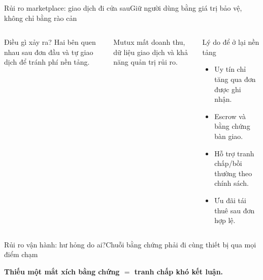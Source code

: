 \begin{frame}{Rủi ro marketplace: giao dịch đi cửa sau}{Giữ người dùng bằng giá trị bảo vệ, không chỉ bằng rào cản}
  \begin{columns}[T,onlytextwidth]
      \begin{alertblock}{Điều gì xảy ra?}
        Hai bên quen nhau sau đơn đầu và tự giao dịch để tránh phí nền tảng.
      \end{alertblock}
      \vspace{.3em}
      Mutux mất doanh thu, dữ liệu giao dịch và khả năng quản trị rủi ro.
      \begin{exampleblock}{Lý do để ở lại nền tảng}
        \begin{itemize}\small
          \item Uy tín chỉ tăng qua đơn được ghi nhận.
          \item Escrow và bằng chứng bàn giao.
          \item Hỗ trợ tranh chấp/bồi thường theo chính sách.
          \item Ưu đãi tái thuê sau đơn hợp lệ.
        \end{itemize}
      \end{exampleblock}
  \end{columns}
\end{frame}

\begin{frame}{Rủi ro vận hành: hư hỏng do ai?}{Chuỗi bằng chứng phải đi cùng thiết bị qua mọi điểm chạm}
  \vspace{1em}
  \centering
  \vfill
  \centering\textcolor{mutuxOrange}{\textbf{Thiếu một mắt xích bằng chứng $=$ tranh chấp khó kết luận.}}
\end{frame}

